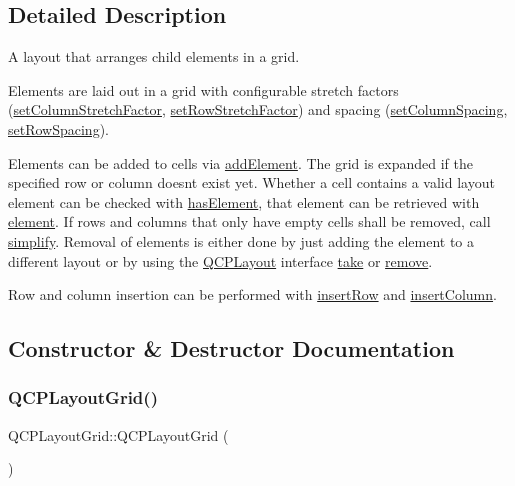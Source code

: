\subsection{Detailed Description}
A layout that arranges child elements in a grid. 

Elements are laid out in a grid with configurable stretch factors (\hyperlink{class_q_c_p_layout_grid_ae38f31a71687b9d7ee3104852528fb50}{set\+Column\+Stretch\+Factor}, \hyperlink{class_q_c_p_layout_grid_a7b0273de5369bd93d942edbaf5b166ec}{set\+Row\+Stretch\+Factor}) and spacing (\hyperlink{class_q_c_p_layout_grid_a3a49272aba32bb0fddc3bb2a45a3dba0}{set\+Column\+Spacing}, \hyperlink{class_q_c_p_layout_grid_aaef2cd2d456197ee06a208793678e436}{set\+Row\+Spacing}).

Elements can be added to cells via \hyperlink{class_q_c_p_layout_grid_adff1a2ca691ed83d2d24a4cd1fe17012}{add\+Element}. The grid is expanded if the specified row or column doesn\textquotesingle{}t exist yet. Whether a cell contains a valid layout element can be checked with \hyperlink{class_q_c_p_layout_grid_ab0cf4f7edc9414a3bfaddac0f46dc0a0}{has\+Element}, that element can be retrieved with \hyperlink{class_q_c_p_layout_grid_a602b426609b4411cf6a93c3ddf3a381a}{element}. If rows and columns that only have empty cells shall be removed, call \hyperlink{class_q_c_p_layout_grid_a08bba60e4acd20165526a8fd7f986b58}{simplify}. Removal of elements is either done by just adding the element to a different layout or by using the \hyperlink{class_q_c_p_layout}{Q\+C\+P\+Layout} interface \hyperlink{class_q_c_p_layout_grid_a666a9fe9e92054436f9b66eba25cca0c}{take} or \hyperlink{class_q_c_p_layout_a6c58f537d8086f352576ab7c5b15d0bc}{remove}.

Row and column insertion can be performed with \hyperlink{class_q_c_p_layout_grid_a48af3dd7c3a653d9c3d7dd99bd02e838}{insert\+Row} and \hyperlink{class_q_c_p_layout_grid_a1e880a321dbe8b43b471ccd764433dc4}{insert\+Column}. 

\subsection{Constructor \& Destructor Documentation}
\hypertarget{class_q_c_p_layout_grid_ab2a4c1587dc8aed4c41c509c8d8d2a64}{}\label{class_q_c_p_layout_grid_ab2a4c1587dc8aed4c41c509c8d8d2a64} 
\subsubsection{\texorpdfstring{Q\+C\+P\+Layout\+Grid()}{QCPLayoutGrid()}}
{\footnotesize\ttfamily Q\+C\+P\+Layout\+Grid\+::\+Q\+C\+P\+Layout\+Grid (\begin{DoxyParamCaption}{ }\end{DoxyParamCaption})\hspace{0.3cm}{\ttfamily [explicit]}}

